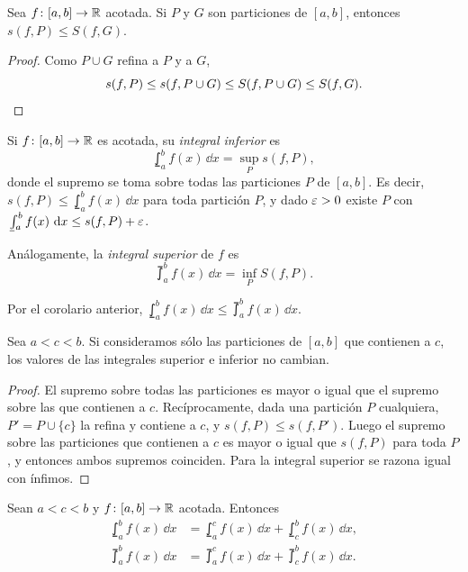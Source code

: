 \begin{corollary}
  Sea \(f\colon [a, b] \to \mathbb{R}\) acotada. Si \(P\) y \(G\) son particiones de \([a, b]\), entonces \(s(f, P) \leq S(f, G)\).
\end{corollary}

\begin{proof}
  Como \(P \cup G\) refina a \(P\) y a \(G\),
  \[
    s(f, P) \leq s(f, P \cup G) \leq S(f, P \cup G) \leq S(f, G). \qedhere
  \]
\end{proof}

\begin{definition}
  Si \(f\colon [a, b] \to \mathbb{R}\) es acotada, su \emph{integral inferior} es
  \[
    \lowint_a^b f(x) \,\dd x = \sup_P s(f, P),
  \]
  donde el supremo se toma sobre todas las particiones \(P\) de \([a, b]\). Es decir, \(s(f, P) \leq \lowint_a^b f(x) \,\dd x\) para toda partición \(P\), y dado \(\varepsilon > 0\) existe \(P\) con \(\lowint_a^b f(x) \,\dd x \leq s(f, P) + \e\).
\end{definition}

\begin{definition}
  Análogamente, la \emph{integral superior} de \(f\) es
  \[
    \upint_a^b f(x) \,\dd x = \inf_P S(f, P).
  \]
\end{definition}

Por el corolario anterior, \(\lowint_a^b f(x) \,\dd x \leq \upint_a^b f(x) \,\dd x\).

\begin{lemma}
  Sea \(a < c < b\). Si consideramos sólo las particiones de \([a, b]\) que contienen a \(c\), los valores de las integrales superior e inferior no cambian.
\end{lemma}

\begin{proof}
  El supremo sobre todas las particiones es mayor o igual que el supremo sobre las que contienen a \(c\). Recíprocamente, dada una partición \(P\) cualquiera, \(P' = P \cup \{c\}\) la refina y contiene a \(c\), y \(s(f, P) \leq s(f, P')\). Luego el supremo sobre las particiones que contienen a \(c\) es mayor o igual que \(s(f, P)\) para toda \(P\), y entonces ambos supremos coinciden. Para la integral superior se razona igual con ínfimos.
\end{proof}

\begin{theorem}
  Sean \(a < c < b\) y \(f\colon [a, b] \to \mathbb{R}\) acotada. Entonces
  \begin{align*}
    \lowint_a^b f(x) \,\dd x & = \lowint_a^c f(x) \,\dd x + \lowint_c^b f(x) \,\dd x, \\
    \upint_a^b f(x) \,\dd x  & = \upint_a^c f(x) \,\dd x + \upint_c^b f(x) \,\dd x.
  \end{align*}
\end{theorem}

